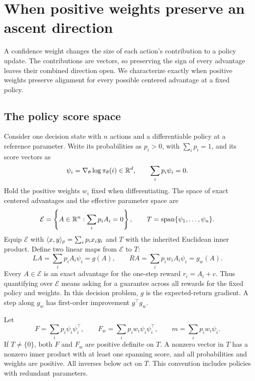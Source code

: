 \section{When positive weights preserve an ascent direction}
\label{sec:weighting}

A confidence weight changes the size of each action's contribution to a policy update. The contributions are vectors, so preserving the sign of every advantage leaves their combined direction open. We characterize exactly when positive weights preserve alignment for every possible centered advantage at a fixed policy.

\subsection{The policy score space}

Consider one decision state with $n$ actions and a differentiable policy at a reference parameter. Write its probabilities as $p_i>0$, with $\sum_i p_i=1$, and its score vectors as
\[
\psi_i=\nabla_\theta\log\pi_\theta(i)\in\mathbb{R}^d,
\qquad \sum_i p_i\psi_i=0.
\]
Hold the positive weights $w_i$ fixed when differentiating. The space of exact centered advantages and the effective parameter space are
\[
\mathcal E=\left\{A\in\mathbb{R}^n:\sum_i p_iA_i=0\right\},
\qquad T=\operatorname{span}\{\psi_1,\ldots,\psi_n\}.
\]
Equip $\mathcal E$ with $\langle x,y\rangle_p=\sum_i p_ix_iy_i$ and $T$ with the inherited Euclidean inner product. Define two linear maps from $\mathcal E$ to $T$:
\begin{equation}
LA=\sum_i p_iA_i\psi_i=g(A),\qquad
RA=\sum_i p_iw_iA_i\psi_i=g_w(A).
\label{eq:gradient-maps}
\end{equation}
Every $A\in\mathcal E$ is an exact advantage for the one-step reward $r_i=A_i+c$. Thus quantifying over $\mathcal E$ means asking for a guarantee across all rewards for the fixed policy and weights. In this decision problem, $g$ is the expected-return gradient. A step along $g_w$ has first-order improvement $g^\top g_w$.

Let
\begin{equation}
F=\sum_i p_i\psi_i\psi_i^\top,\qquad
F_w=\sum_i p_iw_i\psi_i\psi_i^\top,\qquad
m=\sum_i p_iw_i\psi_i.
\label{eq:fisher-matrices}
\end{equation}
If $T\ne\{0\}$, both $F$ and $F_w$ are positive definite on $T$. A nonzero vector in $T$ has a nonzero inner product with at least one spanning score, and all probabilities and weights are positive. All inverses below act on $T$. This convention includes policies with redundant parameters.

